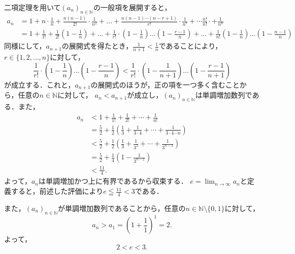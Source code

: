
\begin{tproof}
    二項定理を用いて$(a_n)_{n \in \mathbb{N}}$の一般項を展開すると，
    \begin{align*}
        a_n & =  1 + n \cdot \frac{1}{n} + \frac{n(n-1)}{2!} \cdot \frac{1}{n^2} + \dots + \frac{n(n-1)\cdots(n-r+1)}{r!} \cdot \frac{1}{n^r} + \cdots \frac{n!}{n!} \cdot + \frac{1}{n^n}                                                                              \\
            & = 1+ \frac{1}{1!} + \frac{1}{2!} \left(1- \frac{1}{n} \right) + \dots + \frac{1}{r!} \cdot  \left(1 - \frac{1}{n} \right) \dots \left (1-\frac{r-1}{n} \right) + \dots +  \frac{1}{n!} \left(1 - \frac{1}{n} \right) \dots \left(1- \frac{n-1}{n} \right)
    \end{align*}
    同様にして，$a_{n+1}$の展開式を得たとき，$ \frac{1}{n+1} < \frac{1}{n}$であることにより，$r\in \{ 1,2,\dots ,n\}$に対して，
    \[
        \frac{1}{r!} \cdot  \left(1 - \frac{1}{n} \right) \dots \left (1-\frac{r-1}{n} \right) < \frac{1}{r!} \cdot  \left(1 - \frac{1}{n+1} \right) \dots \left (1-\frac{r-1}{n+1} \right)
    \]
    が成立する．これと，$a_{n+1}$の展開式のほうが，正の項を一つ多く含むことから，任意の$n \in \mathbb{N}$に対して，
    $a_{n} < a_{n+1}$が成立し，$(a_n)_{n \in \mathbb{N}}$は単調増加数列である．また，
    \begin{align*}
        a_n
         & < 1 + \frac{1}{1!} + \frac{1}{2!} + \cdots + \frac{1}{n!}                                                         \\
         & = \frac{5}{2} + \frac{1}{2}\left(\frac{1}{3} + \frac{1}{3 \cdot 4} + \cdots + \frac{1}{3 \cdot 4 \cdots n}\right) \\
         & < \frac{5}{2} + \frac{1}{2}\left(\frac{1}{3} + \frac{1}{3^2} + \cdots + \frac{1}{3^{n-2}}\right)                  \\
         & = \frac{5}{2} + \frac{1}{4}\left(1 - \frac{1}{3^{n-2}}\right)                                                     \\
         & < \frac{11}{4}.
    \end{align*}
    よって，$a_n$は単調増加かつ上に有界であるから収束する．
    $e = \lim_{n \to \infty} a_n$と定義すると，前述した評価により$e \leqq \frac{11}{4} < 3$である．

    また，$(a_n)_{n \in \mathbb{N}}$が単調増加数列であることから，任意の$n \in \mathbb{N} \setminus \{0,1\}$に対して，
    \[
        a_n > a_1 = \left(1+\frac{1}{1}\right)^1 =2.
    \]
    よって，
    \[
        2<e<3.
    \]
\end{tproof}



